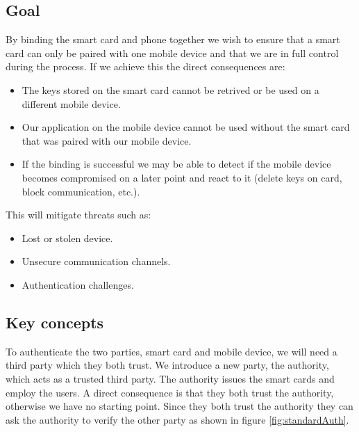 \subsection{Goal}
By binding the smart card and phone together we wish to ensure that a smart card can only be paired with one mobile device and that we are in full control during the process. If we achieve this the direct consequences are:
\begin{itemize}
  \item The keys stored on the smart card cannot be retrived or be used on a different mobile device.
  \item Our application on the mobile device cannot be used without the smart card that was paired with our mobile device.
  \item If the binding is successful we may be able to detect if the mobile device becomes compromised on a later point and react to it (delete keys on card, block communication, etc.).
\end{itemize}

This will mitigate threats such as:
\begin{itemize}
  \item Lost or stolen device.
  \item Unsecure communication channels.
  \item Authentication challenges.
\end{itemize}

\subsection{Key concepts}
To authenticate the two parties, smart card and mobile device, we will need a third party which they both trust. We introduce a new party, the authority, which acts as a trusted third party. The authority issues the smart cards and employ the users. A direct consequence is that they both trust the authority, otherwise we have no starting point. Since they both trust the authority they can ask the authority to verify the other party as shown in figure \ref{fig:standardAuth}.

